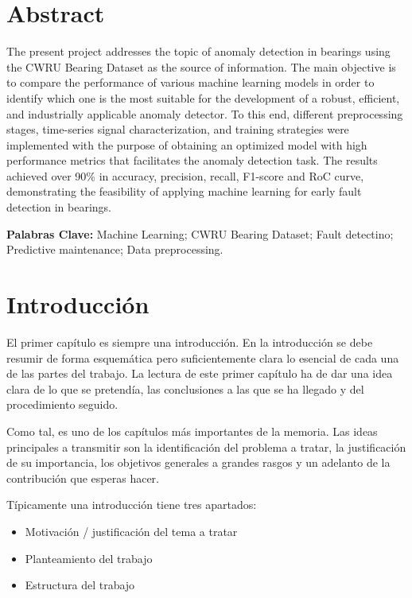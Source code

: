 \documentclass[11pt,a4paper,spanish]{book}
\numberwithin{equation}{chapter}
\numberwithin{figure}{chapter}
\begin{document}
\chapter{Abstract}
The present project addresses the topic of anomaly detection in bearings using the CWRU
Bearing Dataset as the source of information. The main objective is to compare the 
performance of various machine learning models in order to identify which one is the most
suitable for the development of a robust, efficient, and industrially applicable anomaly
detector. To this end, different preprocessing stages, time-series signal characterization,
and training strategies were implemented with the purpose of obtaining an optimized model
with high performance metrics that facilitates the anomaly detection task. The results 
achieved over 90\% in accuracy, precision, recall, F1-score and RoC curve, demonstrating
the feasibility of applying machine learning for early fault detection in bearings.

{\bf Palabras Clave:} Machine Learning; CWRU Bearing Dataset; Fault detectino;
Predictive maintenance; Data preprocessing.




\mainmatter
\chapter{Introducción}

El primer capítulo es siempre una introducción. En la introducción se debe resumir de forma esquemática pero suficientemente clara lo esencial de cada una de las partes del trabajo. La lectura de este primer capítulo ha de dar una idea clara de lo que se pretendía, las conclusiones a las que se ha llegado y del procedimiento seguido.

Como tal, es uno de los capítulos más importantes de la memoria. Las ideas principales a transmitir son la identificación del problema a tratar, la justificación de su importancia, los objetivos generales a grandes rasgos y un adelanto de la contribución que esperas hacer.

Típicamente una introducción tiene tres apartados:
\begin{itemize}
\item Motivación / justificación del tema a tratar
\item Planteamiento del trabajo
\item Estructura del trabajo
\end{itemize}
\end{document}
